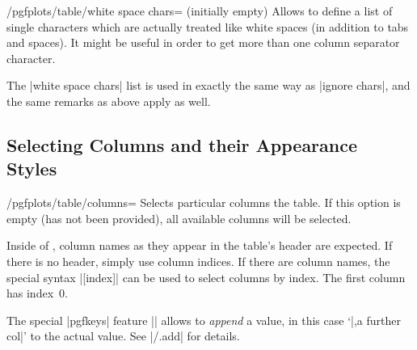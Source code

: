 \begin{key}{/pgfplots/table/white space chars= (initially empty)}
	Allows to define a list of single characters which are actually treated like white spaces (in addition to tabs and spaces). It might be useful in order to get more than one column separator character.

	The |white space chars| list is used in exactly the same way as |ignore chars|, and the same remarks as above apply as well.
\end{key}

\subsection{Selecting Columns and their Appearance Styles}
\begin{key}{/pgfplots/table/columns=}
	Selects particular columns the table. If this option is empty (has not been provided), all available columns will be selected.

	Inside of , column names as they appear in the table's header are expected. If there is no header, simply use column indices. If there are column names, the special syntax |[index]| can be used to select columns by index. The first column has index~$0$.
\begin{codeexample}[]
\end{codeexample}
	
	The special |pgfkeys| feature || allows to \emph{append} a value, in this case `|,a further col|' to the actual value. See |/.add| for details.
\end{key}

